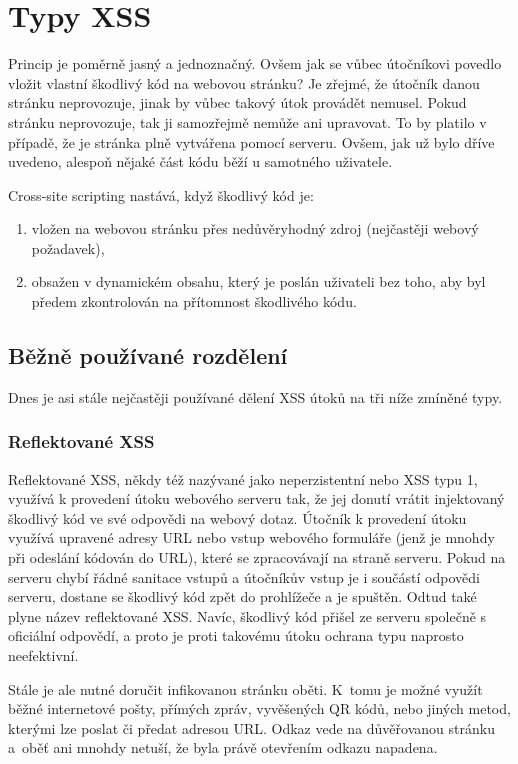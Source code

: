 \documentclass[11pt,conference]{IEEEtran}
\begin{document}
\section{Typy XSS}
Princip je poměrně jasný a jednoznačný. Ovšem jak se vůbec útočníkovi povedlo vložit vlastní škodlivý kód na webovou stránku? Je zřejmé, že útočník danou stránku neprovozuje, jinak by vůbec takový útok provádět nemusel. Pokud stránku neprovozuje, tak ji samozřejmě nemůže ani upravovat. To by platilo v případě, že je stránka plně vytvářena pomocí serveru. Ovšem, jak už bylo dříve uvedeno, alespoň nějaké část kódu běží u samotného uživatele. 

Cross-site scripting nastává, když škodlivý kód je:
\begin{enumerate}
    \item vložen na webovou stránku přes nedůvěryhodný zdroj (nejčastěji webový požadavek),
    \item obsažen v dynamickém obsahu, který je poslán uživateli bez toho, aby byl předem zkontrolován na přítomnost škodlivého kódu.
\end{enumerate}

\subsection{Běžně používané rozdělení}
Dnes je asi stále nejčastěji používané dělení XSS útoků na tři níže zmíněné typy. 

\subsubsection{Reflektované XSS}
Reflektované XSS, někdy též nazývané jako neperzistentní nebo XSS typu 1, využívá k provedení útoku webového serveru tak, že jej donutí vrátit injektovaný škodlivý kód ve své odpovědi na webový dotaz. Útočník k provedení útoku využívá upravené adresy URL nebo vstup webového formuláře (jenž je mnohdy při odeslání kódován do URL), které se zpracovávají na straně serveru. Pokud na serveru chybí řádné sanitace vstupů a útočníkův vstup je i součástí odpovědi serveru, dostane se škodlivý kód zpět do prohlížeče a je spuštěn. Odtud také plyne název reflektované XSS. Navíc, škodlivý kód přišel ze serveru společně s oficiální odpovědí, a proto je proti takovému útoku ochrana typu  naprosto neefektivní. 

Stále je ale nutné doručit infikovanou stránku oběti. K~tomu je možné využít běžné internetové pošty, přímých zpráv, vyvěšených QR kódů, nebo jiných metod, kterými lze poslat či předat adresou URL. Odkaz vede na důvěřovanou stránku a~oběť ani mnohdy netuší, že byla právě otevřením odkazu napadena.
\end{document}
